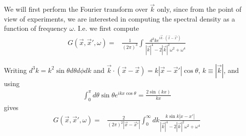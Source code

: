 \documentclass[aps,preprintnumbers,superscriptaddress,longbibliography]{revtex4-1}
\begin{document}



We will first perform the Fourier transform over $\vec{k}$ only, since from the point of view of experiments, we are interested in computing the spectral density as a function of frequency $\omega$. I.e. we first compute
\begin{align}
   G(\vec{x},\vec{x}',\omega)=&\frac{1}{ (2\pi)^3}\int\frac{d^3k e^{i\vec{k}\cdot(\vec{x}-\vec{x}')}}{|\vec{k}|^4-2|\vec{k}|^2\omega^2+\omega^4}%
\label{eq:phispec}
\end{align}

Writing $d^3k=k^2\sin{\theta}d\theta d\phi dk$ and $\vec{k}\cdot (\vec{x}-\vec{x})=k|\vec{x}-\vec{x}'|\cos\theta$, $k\equiv |\vec{k}|$, and using 
\begin{align}
\int_0^\pi d\theta \sin\theta e^{ikx\cos\theta}=\frac{2\sin(kx)}{kx}
    \label{eq:int1}
\end{align}
gives
\begin{align}
   G(\vec{x},\vec{x}',\omega)=&\frac{2}{ (2\pi)^2 |\vec{x}-\vec{x}'|}\int_0^\infty dk\frac{ k\sin{k|x-x'|}}{|\vec{k}|^4-2|\vec{k}|^2\omega^2+\omega^4}%
\label{eq:int3}
\end{align}




\end{document}
